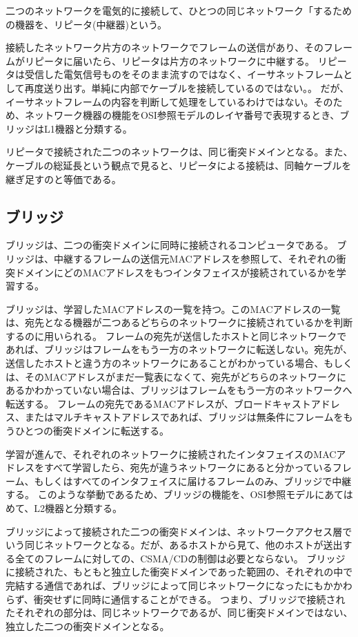 二つのネットワークを電気的に接続して、ひとつの同じネットワーク「するための機器を、リピータ(中継器)という。

接続したネットワーク片方のネットワークでフレームの送信があり、そのフレームがリピータに届いたら、リピータは片方のネットワークに中継する。
リピータは受信した電気信号ものをそのまま流すのではなく、イーサネットフレームとして再度送り出す。単純に内部でケーブルを接続しているのではない。。
だが、イーサネットフレームの内容を判断して処理をしているわけではない。そのため、ネットワーク機器の機能をOSI参照モデルのレイヤ番号で表現するとき、ブリッジはL1機器と分類する。

リピータで接続された二つのネットワークは、同じ衝突ドメインとなる。また、ケーブルの総延長という観点で見ると、リピータによる接続は、同軸ケーブルを継ぎ足すのと等価である。

\subsection{ブリッジ}

ブリッジは、二つの衝突ドメインに同時に接続されるコンピュータである。
ブリッジは、中継するフレームの送信元MACアドレスを参照して、それぞれの衝突ドメインにどのMACアドレスをもつインタフェイスが接続されているかを学習する。

ブリッジは、学習したMACアドレスの一覧を持つ。このMACアドレスの一覧は、宛先となる機器が二つあるどちらのネットワークに接続されているかを判断するのに用いられる。
フレームの宛先が送信したホストと同じネットワークであれば、ブリッジはフレームをもう一方のネットワークに転送しない。宛先が、送信したホストと違う方のネットワークにあることがわかっている場合、もしくは、そのMACアドレスがまだ一覧表になくて、宛先がどちらのネットワークにあるかわかっていない場合は、ブリッジはフレームをもう一方のネットワークへ転送する。
フレームの宛先であるMACアドレスが、ブロードキャストアドレス、またはマルチキャストアドレスであれば、ブリッジは無条件にフレームをもうひとつの衝突ドメインに転送する。

学習が進んで、それぞれのネットワークに接続されたインタフェイスのMACアドレスをすべて学習したら、宛先が違うネットワークにあると分かっているフレーム、もしくはすべてのインタフェイスに届けるフレームのみ、ブリッジで中継する。
このような挙動であるため、ブリッジの機能を、OSI参照モデルにあてはめて、L2機器と分類する。

ブリッジによって接続された二つの衝突ドメインは、ネットワークアクセス層でいう同じネットワークとなる。だが、あるホストから見て、他のホストが送出する全てのフレームに対しての、CSMA/CDの制御は必要とならない。
ブリッジに接続された、もともと独立した衝突ドメインであった範囲の、それぞれの中で完結する通信であれば、ブリッジによって同じネットワークになったにもかかわらず、衝突せずに同時に通信することができる。
つまり、ブリッジで接続されたそれぞれの部分は、同じネットワークであるが、同じ衝突ドメインではない、独立した二つの衝突ドメインとなる。


